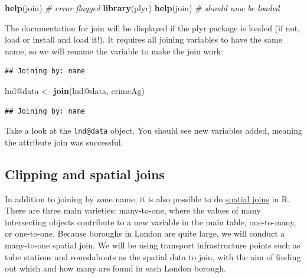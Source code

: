\documentclass[]{article}
\newenvironment{Shaded}{}{}
\newcommand{\KeywordTok}[1]{\textcolor[rgb]{0.00,0.44,0.13}{\textbf{{#1}}}}
\newcommand{\DataTypeTok}[1]{\textcolor[rgb]{0.56,0.13,0.00}{{#1}}}
\newcommand{\StringTok}[1]{\textcolor[rgb]{0.25,0.44,0.63}{{#1}}}
\newcommand{\CommentTok}[1]{\textcolor[rgb]{0.38,0.63,0.69}{\textit{{#1}}}}
\newcommand{\NormalTok}[1]{{#1}}
\begin{document}
\begin{Shaded}
\begin{Highlighting}[]
\KeywordTok{help}\NormalTok{(join)  }\CommentTok{# error flagged}
\KeywordTok{library}\NormalTok{(plyr)}
\KeywordTok{help}\NormalTok{(join)  }\CommentTok{# should now be loaded}
\end{Highlighting}
\end{Shaded}

The documentation for join will be displayed if the plyr package is
loaded (if not, load or install and load it!). It requires all joining
variables to have the same name, so we will rename the variable to make
the join work:

\begin{Shaded}
\end{Shaded}

\begin{verbatim}
## Joining by: name
\end{verbatim}

\begin{Shaded}
\begin{Highlighting}[]
\NormalTok{lnd@data <-}\StringTok{ }\KeywordTok{join}\NormalTok{(lnd@data, crimeAg)}
\end{Highlighting}
\end{Shaded}

\begin{verbatim}
## Joining by: name
\end{verbatim}

Take a look at the \texttt{lnd@data} object. You should see new
variables added, meaning the attribute join was successful.

\subsection{Clipping and spatial
joins}\label{clipping-and-spatial-joins}

In addition to joining by zone name, it is also possible to do
\href{http://help.arcgis.com/en/arcgisdesktop/10.0/help/index.html\#//00080000000q000000}{spatial
joins} in R. There are three main varieties: many-to-one, where the
values of many intersecting objects contribute to a new variable in the
main table, one-to-many, or one-to-one. Because boroughs in London are
quite large, we will conduct a many-to-one spatial join. We will be
using transport infrastructure points such as tube stations and
roundabouts as the spatial data to join, with the aim of finding out
which and how many are found in each London borough.
\end{document}
